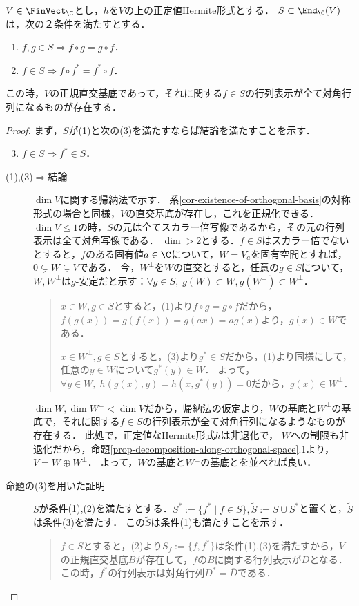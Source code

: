 \documentclass[uplatex, dvipdfmx]{jsreport}
\begin{document}
\begin{proposition}[対角化の抽象理論]\label{prop-Hermite-diagonalizability}
    $V\in\FinVect_\C$とし，$h$を$V$の上の正定値Hermite形式とする．
    $S\subset\End_\C(V)$は，次の２条件を満たすとする．
    \begin{enumerate}[(1)]
        \item $f,g\in S\Rightarrow f\circ g=g\circ f$．
        \item $f\in S\Rightarrow f\circ f^*=f^*\circ f$．
    \end{enumerate}
    この時，$V$の正規直交基底であって，それに関する$f\in S$の行列表示が全て対角行列になるものが存在する．
\end{proposition}
\begin{proof}まず，$S$が(1)と次の(3)を満たすならば結論を満たすことを示す．
    \begin{enumerate}[(1)]\setcounter{enumi}{2}
        \item $f\in S\Rightarrow f^*\in S$．
    \end{enumerate}
    \begin{description}
        \item[(1),(3)$\Rightarrow$結論] 
        $\dim V$に関する帰納法で示す．
        系\ref{cor-existence-of-orthogonal-basis}の対称形式の場合と同様，$V$の直交基底が存在し，これを正規化できる．
        $\dim V\le 1$の時，$S$の元は全てスカラー倍写像であるから，その元の行列表示は全て対角写像である．
        $\dim >2$とする．$f\in S$はスカラー倍でないとすると，$f$のある固有値$a\in\C$について，$W=V_a$を固有空間とすれば，$0\subsetneq W\subsetneq V$である．
        今，$W^\perp$を$W$の直交とすると，任意の$g\in S$について，$W,W^\perp$は$g$-安定だと示す：$\forall g\in S,\;g(W)\subset W,g(W^\perp)\subset W^\perp$．
        \begin{quotation}
            $x\in W,g\in S$とすると，(1)より$f\circ g=g\circ f$だから，$f(g(x))=g(f(x))=g(ax)=ag(x)$より，$g(x)\in W$である．

            $x\in W^\perp,g\in S$とすると，(3)より$g^*\in S$だから，(1)より同様にして，任意の$y\in W$について$g^*(y)\in W$．
            よって，$\forall y\in W,\;h(g(x),y)=h(x,g^*(y))=0$だから，$g(x)\in W^\perp$．
        \end{quotation}
        $\dim W,\dim W^\perp<\dim V$だから，帰納法の仮定より，$W$の基底と$W^\perp$の基底で，それに関する$f\in S$の行列表示が全て対角行列になるようなものが存在する．
        此処で，正定値なHermite形式$h$は非退化で，
        $W$への制限も非退化だから，命題\ref{prop-decomposition-along-orthogonal-space}.1より，$V=W\oplus W^\perp$．
        よって，$W$の基底と$W^\perp$の基底とを並べれば良い．
        \item[命題の(3)を用いた証明]
        $S$が条件(1),(2)を満たすとする．$S^*:=\{f^*\mid f\in S\},\tilde{S}:=S\cup S^*$と置くと，$\tilde{S}$は条件(3)を満たす．
        この$\tilde{S}$は条件(1)も満たすことを示す．
        \begin{quotation}
            $f\in S$とすると，(2)より$S_f:=\{f,f^*\}$は条件(1),(3)を満たすから，$V$の正規直交基底$B$が存在して，$f$の$B$に関する行列表示が$D$となる．
            この時，$f^*$の行列表示は対角行列$D^*=\overline{D}$である．


\end{quotation}
\end{description}
\end{proof}
\end{document}
